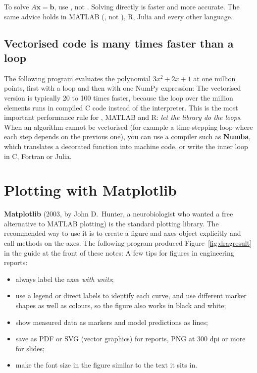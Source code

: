 \begin{pitfall}
To solve $A\mathbf{x} = \mathbf{b}$, use , not
. Solving directly is faster and more accurate. The same
advice holds in MATLAB (, not ), R, Julia and
every other language.
\end{pitfall}

\subsection*{Vectorised code is many times faster than a loop}
\label{sec:numpy-speed}

The following program evaluates the polynomial $3x^2 + 2x + 1$ at one million points, first
with a \py loop and then with one NumPy expression:
The vectorised version is typically 20 to 100 times faster, because the loop over the
million elements runs in compiled C code instead of the \py interpreter. This is the most
important performance rule for \py, MATLAB and R: \emph{let the library do the loops}.
When an algorithm cannot be vectorised (for example a time-stepping loop where each step
depends on the previous one), you can use a compiler such as \textbf{Numba}, which
translates a decorated \py function into machine code, or write the inner loop in C,
Fortran or Julia.

\section{Plotting with Matplotlib}

\textbf{Matplotlib} (2003, by John D.\ Hunter, a neurobiologist who wanted a free
alternative to MATLAB plotting) is the standard plotting library. The recommended way to
use it is to create a figure and axes object explicitly and call methods on the axes. The
following program produced Figure~\ref{fig:dragresult} in the guide at the front of these notes:
A few tips for figures in engineering reports:
\begin{itemize}
\item always label the axes \emph{with units};
\item use a legend or direct labels to identify each curve, and use different marker
  shapes as well as colours, so the figure also works in black and white;
\item show measured data as markers and model predictions as lines;
\item save as PDF or SVG (vector graphics) for reports, PNG at 300 dpi or more for slides;
\item make the font size in the figure similar to the text it sits in.
\end{itemize}

